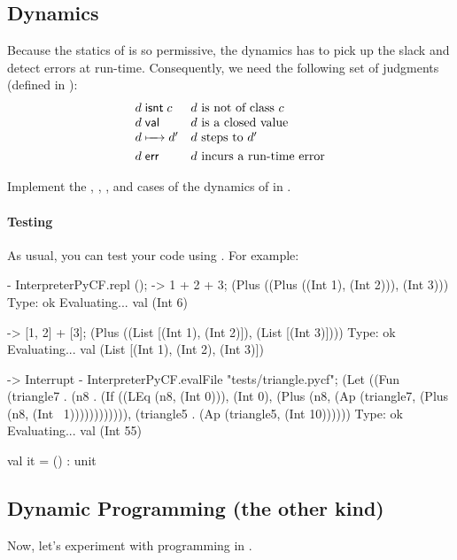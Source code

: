 \documentclass[11pt]{article}
\begin{document}
\subsection{Dynamics}

Because the statics of \LangPyCF{} is so permissive, the dynamics has to pick up the slack and detect errors at run-time.
Consequently, we need the following set of judgments (defined in ):
\[
  \begin{array}{l l}
    {d}\mathrel{\mathsf{isnt}}{c} & \text{$d$ is not of class $c$} \\
    {d}\;{\textsf{val}_{}} & \text{$d$ is a closed value} \\
    {d} \xmapsto[\,\,]{\hspace*{1em}} {d'} & \text{$d$ steps to $d'$} \\
    {d}\;{\textsf{err}_{}} & \text{$d$ incurs a run-time error}
  \end{array}
\]

Implement the , , , and  cases of the dynamics of \LangPyCF{} in .

\paragraph{Testing}
As usual, you can test your code using . For example:
\begin{codeblock}
  - InterpreterPyCF.repl ();
  -> 1 + 2 + 3;
  (Plus ((Plus ((Int 1), (Int 2))), (Int 3)))
  Type: ok
  Evaluating... val (Int 6)

  -> [1, 2] + [3];
  (Plus ((List [(Int 1), (Int 2)]), (List [(Int 3)])))
  Type: ok
  Evaluating... val (List [(Int 1), (Int 2), (Int 3)])

  ->
  Interrupt
  - InterpreterPyCF.evalFile "tests/triangle.pycf";
  (Let ((Fun (triangle7 . (n8 . (If ((LEq (n8, (Int 0))), (Int 0), (Plus (n8, (Ap (triangle7, (Plus (n8, (Int ~1)))))))))))), (triangle5 . (Ap (triangle5, (Int 10))))))
  Type: ok
  Evaluating... val (Int 55)

  val it = () : unit
\end{codeblock}

\subsection{Dynamic Programming (the other kind)}

Now, let's experiment with programming in \LangPyCF{}.
\end{document}
